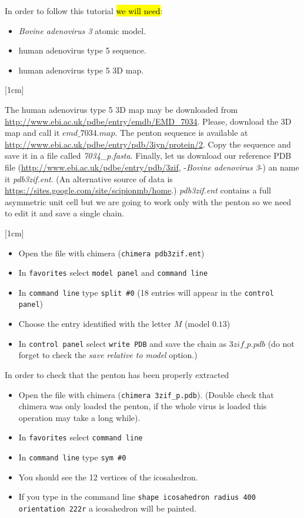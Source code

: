 \documentclass[12pt]{article} %
\newcommand{\iii}[1]{\textit{#1}}
\def \humanAdenoMap {7034}%
\begin{document}
 In order to follow this tutorial \hl{we will need}:
\begin{itemize}
 \item \textit{Bovine adenovirus 3} atomic model.
 \item human adenovirus type 5 sequence.
 \item human adenovirus type 5 3D map.
\end{itemize}

\reversemarginpar
{}[1cm]

The human adenovirus type 5 3D map may be downloaded from \url{http://www.ebi.ac.uk/pdbe/entry/emdb/EMD\_\humanAdenoMap}. Please, download the 3D map and call it $emd\_\humanAdenoMap.map$. The  penton sequence is available at \url{http://www.ebi.ac.uk/pdbe/entry/pdb/3iyn/protein/2}. Copy the sequence and save it in a file called \textit{\humanAdenoMap\_p.fasta}. Finally, let us download our reference PDB file (\url{http://www.ebi.ac.uk/pdbe/entry/pdb/3zif}, -\textit{Bovine adenovirus 3}-) an name it  \textit{pdb3zif.ent}. (An alternative source of data is \url{https://sites.google.com/site/scipionmb/home}.) \textit{pdb3zif.ent} contains a full asymmetric unit cell but we are going to work only with the penton so we need to edit it and save a single chain. 

[1cm]
\begin{itemize}
 \item Open the file with chimera (\texttt{chimera pdb3zif.ent})
 \item In \texttt{favorites} select \texttt{model panel} and \texttt{command line}
 \item In \texttt{command line} type \texttt{split \#0} (18 entries will appear in the \texttt{control panel})
 \item Choose the entry identified with the letter $M$ (model $0.13$) 
 \item In \texttt{control panel} select \texttt{write PDB} and save the chain as $3zif\_p.pdb$ (do not forget to check the  \iii{save relative to model} option.) 
\end{itemize}

In order to check that the penton has been properly extracted

\begin{itemize}
 \item Open the file with chimera (\texttt{chimera 3zif\_p.pdb}). (Double check that chimera was only 
 loaded the penton, if the whole virus is loaded this operation may take a long while).
 \item In \texttt{favorites} select \texttt{command line}
 \item In \texttt{command line} type \texttt{sym \#0} 
 \item You should see the 12 vertices of the icosahedron. 
 \item If you type in the command line \texttt{shape icosahedron radius 400 orientation  222r} a icosahedron will be painted.
\end{itemize}
\end{document}
